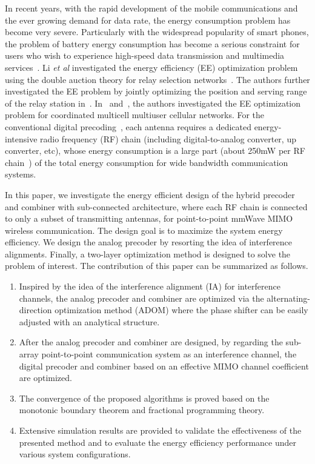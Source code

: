 \documentclass[11pt,draftcls,onecolumn]{IEEEtran}
\begin{document}
In recent years, with the rapid development of the mobile communications and the ever growing demand for data rate,  the energy consumption problem has become very severe. Particularly with the widespread popularity of smart phones, the problem of battery energy consumption has become a serious constraint for users who wish to experience high-speed data transmission and multimedia services~\cite{WCLI2013,TWCLI2015,TVTLi2015,TCOMHE2013,TSPHE2014}. Li \emph{et al} investigated the energy efficiency (EE) optimization problem using the double auction theory for relay selection networks~\cite{TWCLI2015}. The authors further investigated the EE problem by jointly optimizing the position and serving range of the relay station in~\cite{TVTLi2015}. In~\cite{TCOMHE2013} and~\cite{TSPHE2014}, the authors investigated the EE optimization problem for coordinated multicell multiuser cellular networks. For the conventional digital precoding~\cite{TWCLI2015,TVTLi2015,TCOMHE2013,TSPHE2014}, each antenna requires a dedicated energy-intensive radio frequency (RF) chain (including digital-to-analog converter, up converter, etc), whose energy consumption is a large part (about 250mW per RF chain~\cite{TCOMAmdori2015}) of the total energy consumption for wide bandwidth communication systems.

In this paper, we investigate the energy efficient design of the hybrid precoder and combiner with sub-connected architecture, where each RF chain is connected to only a subset of transmitting antennas, for point-to-point mmWave MIMO wireless communication. The design goal is to maximize the system energy efficiency. We design the analog precoder by resorting the idea of interference alignments. Finally, a two-layer optimization method is designed to solve the problem of interest. The contribution of this paper can be summarized as follows.
\begin{enumerate}
\item Inspired by the idea of the interference alignment (IA) for interference channels, the analog precoder and combiner are optimized via the alternating-direction optimization method (ADOM) where the phase shifter can be easily adjusted with an analytical structure.
\item After the analog precoder and combiner are designed, by regarding the sub-array point-to-point communication system as an interference channel, the digital precoder and combiner based on an effective MIMO channel coefficient are optimized.

\item The convergence of the proposed algorithms is proved based on the monotonic boundary theorem and fractional programming theory.

\item Extensive simulation results are provided to validate the effectiveness of the presented method and to evaluate the energy efficiency performance under various system configurations.
\end{enumerate}
\end{document}
